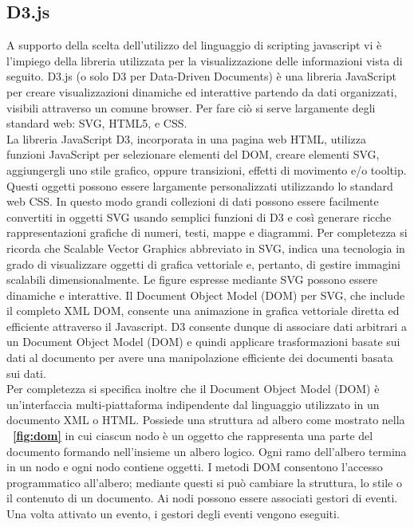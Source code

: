 {	\subsection{D3.js}
A supporto della scelta dell'utilizzo del linguaggio di scripting javascript vi è l'impiego della libreria utilizzata per la visualizzazione delle informazioni vista di seguito. D3.js (o solo D3 per Data-Driven Documents) è una libreria JavaScript per creare visualizzazioni dinamiche ed interattive partendo da dati organizzati, visibili attraverso un comune browser. Per fare ciò si serve largamente degli standard web: SVG, HTML5, e CSS.\\
La libreria JavaScript D3, incorporata in una pagina web HTML, utilizza funzioni JavaScript per selezionare elementi del DOM, creare elementi SVG, aggiungergli uno stile grafico, oppure transizioni, effetti di movimento e/o tooltip. Questi oggetti possono essere largamente personalizzati utilizzando lo standard web CSS. In questo modo grandi collezioni di dati possono essere facilmente convertiti in oggetti SVG usando semplici funzioni di D3 e così generare ricche rappresentazioni grafiche di numeri, testi, mappe e diagrammi. 
Per completezza si ricorda che Scalable Vector Graphics abbreviato in SVG, indica una tecnologia in grado di visualizzare oggetti di grafica vettoriale e, pertanto, di gestire immagini scalabili dimensionalmente. 
Le figure espresse mediante SVG possono essere dinamiche e interattive. Il Document Object Model (DOM) per SVG, che include il completo XML DOM, consente una animazione in grafica vettoriale diretta ed efficiente attraverso il Javascript.
D3 consente dunque di associare dati arbitrari a un Document Object Model (DOM) e quindi applicare trasformazioni basate sui dati al documento per avere una manipolazione efficiente dei documenti basata sui dati. \\
Per completezza si specifica inoltre che il Document Object Model (DOM) è un'interfaccia multi-piattaforma indipendente dal linguaggio utilizzato in un documento XML o HTML. Possiede una struttura ad albero come mostrato nella \textbf{\figurename~\ref{fig:dom}} in cui ciascun nodo è un oggetto che rappresenta una parte del documento formando nell'insieme un albero logico. Ogni ramo dell'albero termina in un nodo e ogni nodo contiene oggetti. I metodi DOM consentono l'accesso programmatico all'albero; mediante questi si può cambiare la struttura, lo stile o il contenuto di un documento. Ai nodi possono essere associati gestori di eventi. Una volta attivato un evento, i gestori degli eventi vengono eseguiti.
}
